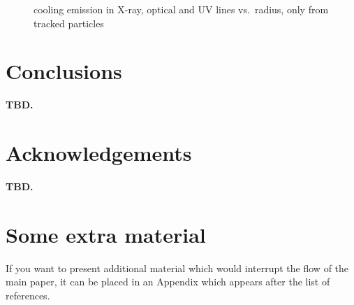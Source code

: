 \documentclass[fleqn,usenatbib]{mnras}
\begin{document}
\begin{figure}
    \centering
    \caption{cooling emission in X-ray, optical and UV lines vs.\ radius, only from tracked particles}
    \label{f:emission}
\end{figure}

\section{Conclusions}

\textbf{TBD.}

\section*{Acknowledgements}

\textbf{TBD.}











\appendix

\section{Some extra material}

If you want to present additional material which would interrupt the flow of the main paper,
it can be placed in an Appendix which appears after the list of references.



\bsp	%
\label{lastpage}
\end{document}
